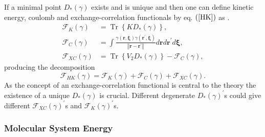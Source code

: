 \documentclass[aps,preprint]{revtex4}%
\begin{document}
If a minimal point $D_{\ast}\left(  \gamma\right)  $ exists and is unique and
then one can define kinetic energy, coulomb and exchange-correlation
functionals by eq. $\left(  \ref{HK}\right)  $ as $.$
\begin{align}
\mathcal{F}_{K}\left(  \gamma\right)   &  =\operatorname{Tr}\left\{  KD_{\ast
}\left(  \gamma\right)  \right\}  ,\nonumber\\
\mathcal{F}_{C}\left(  \gamma\right)   &  =\int\frac{\gamma\left(
\mathbf{r,\xi}\right)  \gamma\left(  \mathbf{r}^{\prime}\mathbf{,\xi}\right)
}{\left\Vert \mathbf{r-r}^{\prime}\right\Vert }d\mathbf{r}d\mathbf{r}^{\prime
}d\mathbf{\xi},\nonumber\\
\mathcal{F}_{XC}\left(  \gamma\right)   &  =\operatorname{Tr}\left\{
V_{2}D_{\ast}\left(  \gamma\right)  \right\}  -\mathcal{F}_{C}\left(
\gamma\right)  ,
\end{align}
producing the decomposition
\begin{equation}
\mathcal{F}_{HK}\left(  \gamma\right)  =\mathcal{F}_{K}\left(  \gamma\right)
+\mathcal{F}_{C}\left(  \gamma\right)  +\mathcal{F}_{XC}\left(  \gamma\right)
.
\end{equation}
As the concept of an exchange-correlation functional is central to the theory
the existence of a unique $D_{\ast}\left(  \gamma\right)  $ is crucial.
Different degenerate $D_{\ast}\left(  \gamma\right)  ^{\prime}$s could give
different $\mathcal{F}_{XC}\left(  \gamma\right)  ^{\prime}$s and
$\mathcal{F}_{K}\left(  \gamma\right)  ^{\prime}$s.

\subsubsection{Molecular System Energy}
\end{document}
